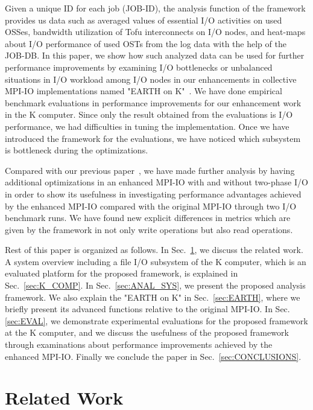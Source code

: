 \documentclass{jhps}
\begin{document}
Given a unique ID for each job (JOB-ID), the analysis function of the framework
provides us data such as averaged values of essential I/O activities on used OSSes,
bandwidth utilization of Tofu interconnects on I/O nodes, and heat-maps about
I/O performance of used OSTs from the log data with the help of the JOB-DB.
In this paper, we show how such analyzed data can be used for further
performance improvements by examining I/O bottlenecks or unbalanced situations
in I/O workload among I/O nodes in our enhancements in collective MPI-IO implementations
named "EARTH on K"~\cite{tsujita:WS_EuroMPI2014,tsujita:hpcasia18}.
We have done empirical benchmark evaluations in performance improvements
for our enhancement work in the K computer.
Since only the result obtained from the evaluations is I/O performance,
we had difficulties in tuning the implementation.
Once we have introduced the framework for the evaluations,
we have noticed which subsystem is bottleneck during the optimizations.

Compared with our previous paper~\cite{tsujita:hpc_iodc20},
we have made further analysis by having additional
optimizations in an enhanced MPI-IO with and without two-phase I/O
in order to show its usefulness
in investigating performance advantages achieved by
the enhanced MPI-IO compared with the original MPI-IO
through two I/O benchmark runs.
We have found new explicit differences in metrics which are given by the framework
in not only write operations but also read operations.

Rest of this paper is organized as follows.
In Sec.~\ref{sec:RELATED_WORK}, we discuss the related work.
A system overview including a file I/O subsystem of the K computer,
which is an evaluated platform for the proposed framework,
is explained in Sec.~\ref{sec:K_COMP}.
In Sec.~\ref{sec:ANAL_SYS}, we present the proposed analysis framework.
We also explain the "EARTH on K" in Sec.~\ref{sec:EARTH},
where we briefly present its advanced functions relative to the original MPI-IO.
In Sec.\ref{sec:EVAL}, we demonstrate experimental evaluations
for the proposed framework at the K computer, and we discuss the usefulness
of the proposed framework through examinations about performance improvements
achieved by the enhanced MPI-IO.
Finally we conclude the paper in Sec.~\ref{sec:CONCLUSIONS}.

\section{Related Work}
\label{sec:RELATED_WORK}
\end{document}
